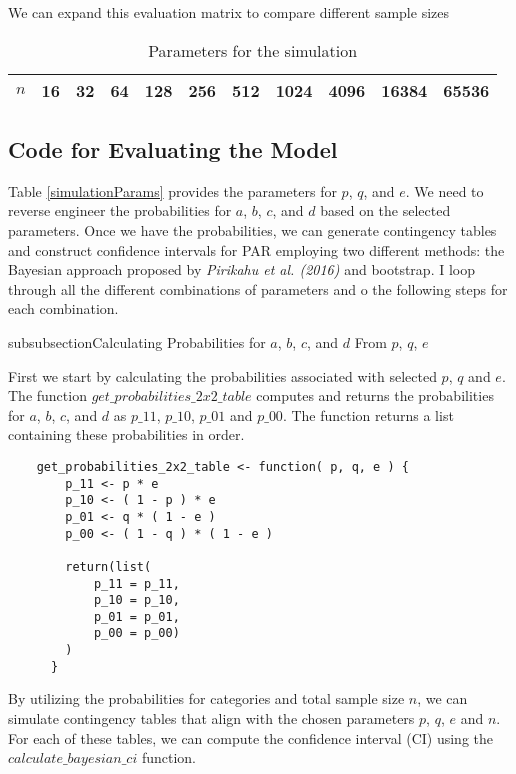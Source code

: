 We can expand this evaluation matrix to compare different sample sizes

\begin{table}[h!] \label{sample-count-parameters}
    \centering
    \caption{Parameters for the simulation}
    \label{sample-count-parameters}
    \begin{tabular}{|c|c|c|c|c|c|c|c|c|c|c|}
    \hline
    $n$ & 16    & 32    & 64   & 128  & 256  & 512  & 1024 & 4096 & 16384 & 65536 \\ \hline
    \end{tabular}
\end{table}
\subsection{Code for Evaluating the Model}

Table \ref{simulationParams} provides the parameters for $p$, $q$, and $e$. We need to reverse engineer the probabilities for $a$, $b$, $c$, and $d$ based on the selected parameters. Once we have the probabilities, we can generate contingency tables and construct confidence intervals for PAR employing two different methods: the Bayesian approach proposed by \textit{Pirikahu et al. (2016)} and bootstrap. I loop through all the different combinations of parameters and o the following steps for each combination.

\*subsubsection{Calculating Probabilities for $a$, $b$, $c$, and $d$ From $p$, $q$, $e$}

First we start by calculating the probabilities associated with selected $p$, $q$ and $e$. The function $get\_probabilities\_2x2\_table$ computes and returns the probabilities for $a$, $b$, $c$, and $d$ as $p\_11$, $p\_10$, $p\_01$ and $p\_00$. The function returns a list containing these probabilities in order.

\begin{lstlisting}
    get_probabilities_2x2_table <- function( p, q, e ) {
        p_11 <- p * e
        p_10 <- ( 1 - p ) * e
        p_01 <- q * ( 1 - e )
        p_00 <- ( 1 - q ) * ( 1 - e )
      
        return(list(
            p_11 = p_11,
            p_10 = p_10,
            p_01 = p_01,
            p_00 = p_00)
        )
      }
\end{lstlisting}

By utilizing the probabilities for categories and total sample size $n$, we can simulate contingency tables that align with the chosen parameters $p$, $q$, $e$ and $n$. For each of these tables, we can compute the confidence interval (CI) using the $calculate\_bayesian\_ci$ function. 

